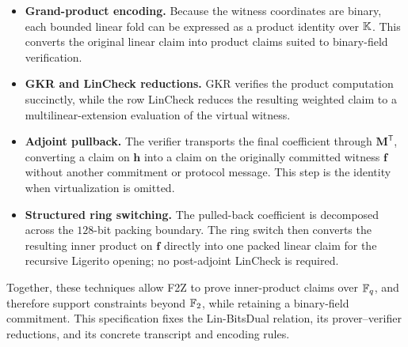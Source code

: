 \documentclass[9pt,letterpaper]{extarticle}
\newenvironment{normative}
  {\par\smallskip\begingroup
   \setlength{\leftskip}{0.7em}\setlength{\rightskip}{0.7em}%
   }
  {\par\endgroup\smallskip}
\begin{document}
\begin{normative}
\begin{itemize}[leftmargin=1.4em]
 \item \textbf{Grand-product encoding.}
       Because the witness coordinates are binary, each bounded linear fold can
       be expressed as a product identity over $\mathbb K$. This converts the original
       linear claim into product claims suited to binary-field verification.

 \item \textbf{GKR and LinCheck reductions.}
       GKR verifies the product computation succinctly, while the row LinCheck
       reduces the resulting weighted claim to a multilinear-extension
       evaluation of the virtual witness.

 \item \textbf{Adjoint pullback.}
       The verifier transports the final coefficient through
       $\bm M^{\mathsf T}$, converting a claim on $\bm h$ into a claim on the
       originally committed witness $\bm f$ without another commitment or
       protocol message. This step is the identity when virtualization is
       omitted.

 \item \textbf{Structured ring switching.}
       The pulled-back coefficient is decomposed across the $128$-bit packing
       boundary.  The ring switch then converts the resulting inner product on
       $\bm f$ directly into one packed linear claim for the recursive Ligerito
       opening; no post-adjoint LinCheck is required.
\end{itemize}

Together, these techniques allow F2Z to prove inner-product claims over $\mathbb F_q$, and
therefore support constraints beyond $\mathbb F_2$, while retaining a binary-field
commitment. This specification fixes the Lin-BitsDual relation, its
prover--verifier reductions, and its concrete transcript and encoding rules.
\end{normative}






\end{document}
